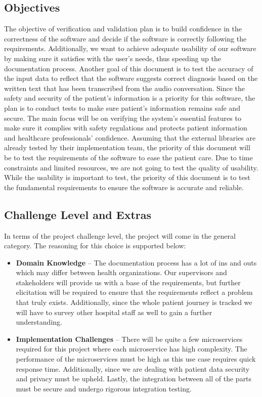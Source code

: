 \documentclass[12pt, titlepage]{article}
\begin{document}
\subsection{Objectives} \label{section:2.2}

The objective of verification and validation plan is to build confidence in the correctness of the software and decide if the software is correctly following the requirements. Additionally, we want to achieve adequate usability of our software by making sure it satisfies with the user's needs, thus speeding up the documentation process. Another goal of this document is to test the accuracy of the input data to reflect that the software suggests correct diagnosis based on the written text that has been transcribed from the audio conversation. Since the safety and security of the patient's information is a priority for this software, the plan is to conduct tests to make sure patient's information remains safe and secure. The main focus will be on verifying the system's essential features to make sure it complies with safety regulations and protects patient information and healthcare professionals' confidence. Assuming that the external libraries are already tested by their implementation team, the priority of this document will be to test the requirements of the software to ease the patient care. Due to time constraints and limited resources, we are not going to test the quality of usability. While the usability is important to test, the priority of this document is to test the fundamental requirements to ensure the software is accurate and reliable. 

\subsection{Challenge Level and Extras} \label{section:2.3}

In terms of the project challenge level, the project will come in the general category. The reasoning for this choice is supported below:

\begin{itemize}
  \item\textbf{Domain Knowledge} -- The documentation process has a lot of ins and outs which may differ between health organizations. Our supervisors and stakeholders will provide us with a base of the requirements, but further elicitation will be required to ensure that the requirements reflect a problem that truly exists. Additionally, since the whole patient journey is tracked we will have to survey other hospital staff as well to gain a further understanding. 
  \item\textbf{Implementation Challenges} -- There will be quite a few microservices required for this project where each microservice has high complexity. The performance of the microservices must be high as this use case requires quick response time. Additionally, since we are dealing with patient data security and privacy must be upheld. Lastly, the integration between all of the parts must be secure and undergo rigorous integration testing.
\end{itemize}
\end{document}
